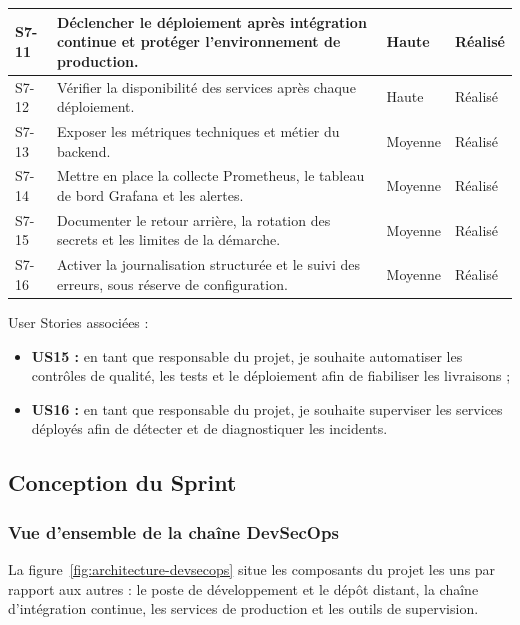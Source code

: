 {\begin{longtable}{|p{0.9cm}|>{\raggedright\arraybackslash}p{9.1cm}|>{\raggedright\arraybackslash}p{1.6cm}|>{\raggedright\arraybackslash}p{1.6cm}|}
S7-11 &
Déclencher le déploiement après intégration continue et protéger l'environnement de production. &
Haute & Réalisé \\
\hline

S7-12 &
Vérifier la disponibilité des services après chaque déploiement. &
Haute & Réalisé \\
\hline

S7-13 &
Exposer les métriques techniques et métier du backend. &
Moyenne & Réalisé \\
\hline

S7-14 &
Mettre en place la collecte Prometheus, le tableau de bord Grafana et les alertes. &
Moyenne & Réalisé \\
\hline

S7-15 &
Documenter le retour arrière, la rotation des secrets et les limites de la démarche. &
Moyenne & Réalisé \\
\hline

S7-16 &
Activer la journalisation structurée et le suivi des erreurs, sous réserve de configuration. &
Moyenne & Réalisé \\
\hline

\end{longtable}}

User Stories associées :

\begin{itemize}
    \item \textbf{US15 :} en tant que responsable du projet, je souhaite automatiser les contrôles de qualité, les tests et le déploiement afin de fiabiliser les livraisons ;
    \item \textbf{US16 :} en tant que responsable du projet, je souhaite superviser les services déployés afin de détecter et de diagnostiquer les incidents.
\end{itemize}

\subsection{Conception du Sprint}

\subsubsection{Vue d'ensemble de la chaîne DevSecOps}

La figure~\ref{fig:architecture-devsecops} situe les composants du projet les uns par rapport aux autres : le poste de développement et le dépôt distant, la chaîne d'intégration continue, les services de production et les outils de supervision.

